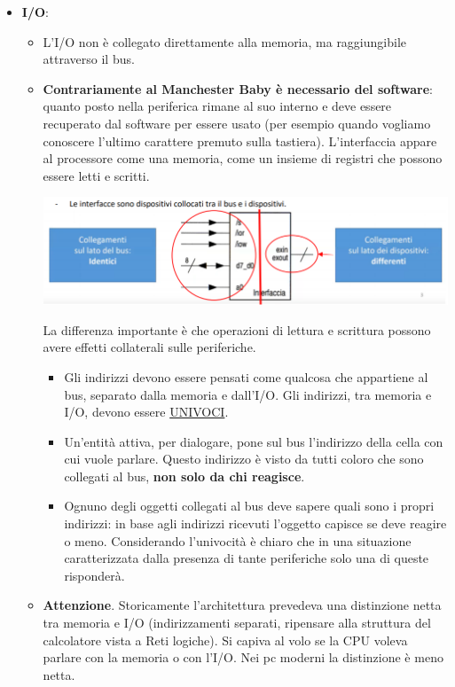 \documentclass[11pt]{report}
\theoremstyle{definition}
\begin{document}
\begin{itemize}
\item \textbf{I/O}:
\begin{itemize}
\item L'I/O non è collegato direttamente alla memoria, ma raggiungibile attraverso il bus.
\item \textbf{Contrariamente al Manchester Baby è necessario del software}: quanto posto nella periferica rimane al suo interno e deve essere recuperato dal software per essere usato (per esempio quando vogliamo conoscere l'ultimo carattere premuto sulla tastiera). L'interfaccia appare al processore come una memoria, come un insieme di registri che possono essere letti e scritti. 
\begin{center}
\includegraphics[scale=.75]{img/132.PNG}
\end{center}
La differenza importante è che operazioni di lettura e scrittura possono avere effetti collaterali sulle periferiche. 

\begin{itemize}
\item Gli indirizzi devono essere pensati come qualcosa che appartiene al bus, separato dalla memoria e dall'I/O. Gli indirizzi, tra memoria e I/O, devono essere \underline{UNIVOCI}.
\item Un'entità attiva, per dialogare, pone sul bus l'indirizzo della cella con cui vuole parlare. Questo indirizzo è visto da tutti coloro che sono collegati al bus, \textbf{non solo da chi reagisce}.
\item Ognuno degli oggetti collegati al bus deve sapere quali sono i propri indirizzi: in base agli indirizzi ricevuti l'oggetto capisce se deve reagire o meno. Considerando l'univocità è chiaro che in una situazione caratterizzata dalla presenza di tante periferiche solo una di queste risponderà.
\end{itemize}

\item \textbf{Attenzione}. Storicamente l'architettura prevedeva una distinzione netta tra memoria e I/O (indirizzamenti separati, ripensare alla struttura del calcolatore vista a Reti logiche). Si capiva al volo se la CPU voleva parlare con la memoria o con l'I/O. Nei pc moderni la distinzione è meno netta.
\end{itemize}
\end{itemize}
\end{document}

